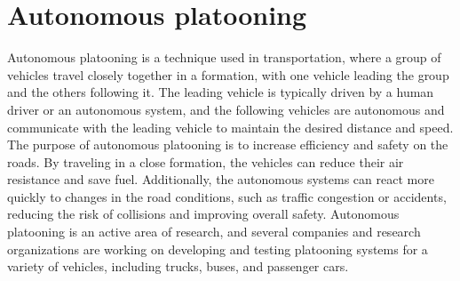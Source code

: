 \section{Autonomous platooning}

Autonomous platooning is a technique used in transportation, where a group of vehicles travel closely together in a formation, with one vehicle leading the group and the others following it. The leading vehicle is typically driven by a human driver or an autonomous system, and the following vehicles are autonomous and communicate with the leading vehicle to maintain the desired distance and speed. The purpose of autonomous platooning is to increase efficiency and safety on the roads. By traveling in a close formation, the vehicles can reduce their air resistance and save fuel. Additionally, the autonomous systems can react more quickly to changes in the road conditions, such as traffic congestion or accidents, reducing the risk of collisions and improving overall safety. Autonomous platooning is an active area of research, and several companies and research organizations are working on developing and testing platooning systems for a variety of vehicles, including trucks, buses, and passenger cars. 
